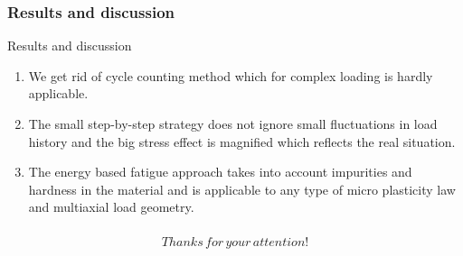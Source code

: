 \documentclass[xcolor=table]{Bredelebeamer}
\begin{document}
\begin{frame}
	\frametitle{Results and discussion}	
		\begin{exampleblock}{ Results and discussion}
\begin{enumerate}
	\item We get rid of cycle counting method which for complex loading is hardly applicable.

	\vspace{6pt}
	\item The small step-by-step strategy does not ignore small fluctuations in load history and the big stress effect is magnified which reflects the real situation.
		
	\vspace{6pt}
	\item   The energy based fatigue approach takes into account impurities and hardness in the material and is applicable to any type of micro plasticity law and multiaxial load geometry.
	

	
\end{enumerate}
\end{exampleblock}
\end{frame}	


\begin{frame}
	\frametitle{}	
	\begin{exampleblock}{}
		{
			\Huge $$Thanks \, for \, your \, attention!$$
		}	  
	\end{exampleblock}
\end{frame}			
\end{document}
